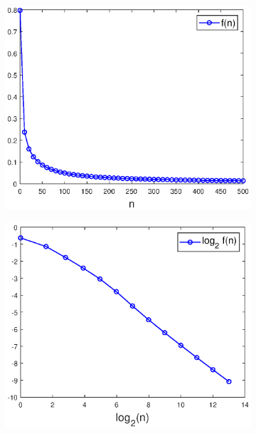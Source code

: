 \documentclass{beamer}
\theoremstyle{definition}
\begin{document}
\begin{frame}
\begin{figure}[!htb]
	\begin{subfigure}{0.42\textwidth}
		\centering
		\includegraphics[width=\textwidth]{decay_22.eps}
	\end{subfigure}
	\begin{subfigure}{0.42\textwidth}
		\centering
		\includegraphics[width=\textwidth]{decay_2.eps}
	\end{subfigure}
\end{figure}

\end{frame}
\end{document}
